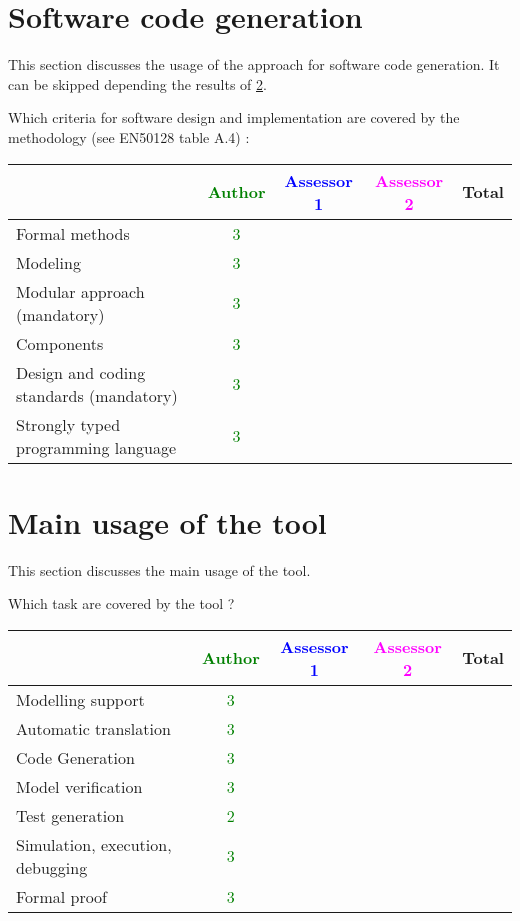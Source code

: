 \section{Software code generation}
This section discusses the usage of the approach for software code generation.
It can be skipped depending the results of \ref{main_usage}.

Which criteria for software design and implementation are covered by the methodology
(see EN50128 table A.4) :

\begin{tabular}{|l | c | c | c | c|}
\hline
& \textcolor{green}{Author} & \textcolor{blue}{Assessor 1} & \textcolor{magenta}{Assessor 2} & Total \\
\hline
Formal methods  & \textcolor{green}{3} & & &  \\
\hline 
Modeling  & \textcolor{green}{3} & & &  \\
\hline
Modular approach (mandatory) & \textcolor{green}{3} & & &  \\
\hline
Components & \textcolor{green}{3} & & &  \\
\hline
Design and coding standards (mandatory) & \textcolor{green}{3} & & &  \\
\hline
Strongly typed programming language & \textcolor{green}{3} & & &  \\
\hline

\end{tabular}



\section{Main usage of the tool}
\label{main_usage}

This section discusses the main usage of the tool.

Which task are covered by the tool ?


\begin{tabular}{|l | c | c | c | c|}
\hline
& \textcolor{green}{Author} & \textcolor{blue}{Assessor 1} & \textcolor{magenta}{Assessor 2} & Total \\
\hline 
Modelling support & \textcolor{green}{3} & & &  \\
\hline
Automatic translation  & \textcolor{green}{3} & & & \\
\hline
Code Generation  & \textcolor{green}{3} & & & \\
\hline
Model verification & \textcolor{green}{3} & & & \\
\hline
Test generation & \textcolor{green}{2} & & & \\
\hline
Simulation, execution, debugging & \textcolor{green}{3} & & & \\
\hline
Formal proof & \textcolor{green}{3} & & & \\
\hline
\end{tabular}

